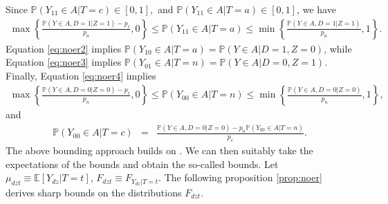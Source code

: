 \documentclass[12pt]{article}
\theoremstyle{plain}
\theoremstyle{definition}
\theoremstyle{remark}
\begin{document}
Since $\mathbb P(Y_{11} \in A \vert T=c) \in [0,1],$ and $\mathbb P(Y_{11} \in A \vert T=a) \in [0,1]$, we have
\begin{eqnarray*}
   \max\left\{\frac{\mathbb P(Y\in A, D=1 \vert Z=1)- p_c}{p_a},0\right\} \leq \mathbb P(Y_{11} \in A \vert T=a) \leq \min\left\{\frac{\mathbb P(Y\in A, D=1 \vert Z=1)}{p_a},1\right\}.  
\end{eqnarray*}
Equation \eqref{eq:noer2} implies $\mathbb P(Y_{10}\in A \vert T=a)=\mathbb P(Y \in A \vert D=1, Z=0)$, while Equation \eqref{eq:noer3} implies $\mathbb P(Y_{01}\in A \vert T=n)=\mathbb P(Y \in A \vert D=0, Z=1)$. Finally, Equation \eqref{eq:noer4} implies
\begin{eqnarray*}
   \max\left\{\frac{\mathbb P(Y\in A, D=0 \vert Z=0)- p_c}{p_n},0\right\} \leq \mathbb P(Y_{00} \in A \vert T=n) \leq \min\left\{\frac{\mathbb P(Y\in A, D=0 \vert Z=0)}{p_n},1\right\},  
\end{eqnarray*}
and 
\begin{eqnarray*}
    \mathbb P(Y_{00} \in A \vert T=c) &=& \frac{\mathbb P(Y\in A, D=0 \vert Z=0)- p_n \mathbb P(Y_{00} \in A \vert T=n)}{p_c}.
\end{eqnarray*}
The above bounding approach builds on \cite{Horowitz1995IdentificationData}. We can then suitably take the expectations of the bounds and obtain the so-called \cite{Lee2009TrainingEffects} bounds. Let $\mu_{dzt}\equiv \mathbb E[Y_{dz} \vert T=t]$, $F_{dzt}\equiv F_{Y_{dz}\vert T=t}$. The following proposition \ref{prop:noer} derives sharp bounds on the distributions $F_{dzt}$.
\end{document}
